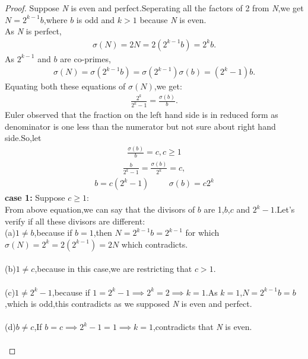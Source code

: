 \documentclass[a4paper,reqno,11pt]{book}
\theoremstyle{plain}%
\theoremstyle{definition}
\begin{document}
\begin{proof} Suppose \textit{N} is even and perfect.Seperating all the factors of 2 from \textit{N},we get $\textit{N}=2^{k-1}b$,where $b$ is odd and $k>1$ because \textit{N} is even.\\
As \textit{N} is perfect,
\begin{eqnarray*}
    \sigma(N)=2N=2(2^{k-1}b)=2^kb.
\end{eqnarray*}
As $2^{k-1}$ and $b$ are co-primes,
\begin{eqnarray*}
    \sigma(N)=\sigma(2^{k-1}b)=\sigma(2^{k-1})\sigma(b)=(2^k-1)b.
\end{eqnarray*}
Equating both these equations of $\sigma(N)$,we get:
\begin{eqnarray*}
    \frac{2^k}{2^k-1}=\frac{\sigma(b)}{b}.
\end{eqnarray*}
Euler observed that the fraction on the left hand side is in reduced form as denominator is one less than the numerator but not sure about right hand side.So,let\\
\begin{eqnarray*}
    \frac{\sigma(b)}{b}=c,c\geq 1 
\end{eqnarray*}
\begin{eqnarray*}
    \frac{b}{2^k-1}=\frac{\sigma(b)}{2^k}=c,
\end{eqnarray*}
\begin{eqnarray*}
    b=c(2^k-1)\hspace{1cm}\sigma(b)=c2^k
\end{eqnarray*}
\textbf{case 1:} Suppose $c\geq1$:\\
From above equation,we can say that the divisors of $b$ are 1,$b$,$c$ and $2^k-1$.Let's verify if all these divisors are different:\\
(a)$1\neq b$,because if $b=1$,then $\textit{N}=2^{k-1}b=2^{k-1}$ for which $\sigma(N)=2^k=2(2^{k-1})=2N$ which contradicts.\\
\\
(b)$1\neq c$,because in this case,we are restricting that $c>1$.\\
\\
\noindent(c)$1\neq 2^k-1$,because if $1=2^k-1\implies2^k=2\implies k=1$.As $k=1$,$N=2^{k-1}b=b$,which is odd,this contradicts as we supposed \textit{N} is even and perfect.\\
\\
(d)$b\neq c$,If $b=c\implies2^k-1=1\implies k=1$,contradicts that \textit{N} is even.\\
\\

\end{proof}
\end{document}
